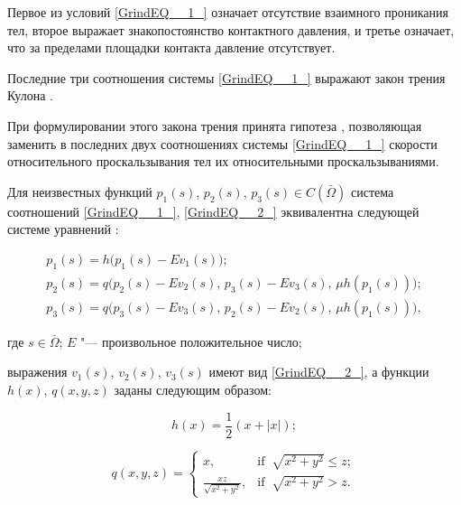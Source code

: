 Первое из условий \eqref{GrindEQ__1_} означает отсутствие взаимного проникания тел, второе выражает знакопостоянство контактного давления, и третье означает, что за пределами площадки контакта давление отсутствует. 

Последние три соотношения системы \eqref{GrindEQ__1_} выражают закон трения Кулона \cite{al:bib12}. 

При формулировании этого закона трения принята гипотеза \cite{al:bib15}, позволяющая заменить в последних двух соотношениях системы \eqref{GrindEQ__1_} скорости относительного проскальзывания тел их относительными проскальзываниями.



Для неизвестных функций $p_{1}(s)$, $p_{2}(s)$, $p_{3}(s)\in C\left(\bar{\Omega }\right)$ система соотношений \eqref{GrindEQ__1_}, \eqref{GrindEQ__2_} эквивалентна следующей системе уравнений \cite{al:bib12}:

\begin{equation} 

\label{GrindEQ__3_} 

\begin{array}{l} 

{p_{1}(s)=h\bigl(p_{1}(s)-E v_{1}(s)\bigr);} 

\\

{p_{2}(s)=q\bigl(p_{2}(s)-E v_{2}(s),\, p_{3}(s)-E v_{3}(s),\,\mu h\left(p_{1}(s)\right)\bigr);} 

\\

{p_{3}(s)=q\bigl(p_{3}(s)-E v_{3}(s),\, p_{2}(s)-E v_{2}(s),\,\mu h\left(p_{1}(s)\right)\bigr),} 

\end{array}

\end{equation}

где $s\in\bar{\Omega }$;  $E$ "--- произвольное положительное число; 

выражения $v_{1}(s)$, $v_{2}(s)$, $v_{3}(s)$ имеют вид \eqref{GrindEQ__2_}, а функции $h(x)$, $q(x,y,z)$ заданы следующим образом:

\[

h(x)=\frac{1}{2}(x+|x|);

\]

\[

q(x,y,z)=\left\{

\begin{array}{cl} 

x, & \textrm{if}\; \; \sqrt{x^{2} +y^{2} } \le z; 

\\[2mm] 

\displaystyle \frac{xz }{\sqrt{x^{2} +y^{2} }}  , & \textrm{if}\; \; \sqrt{x^{2} +y^{2} } >z. 

\end{array}\right. 

\]



